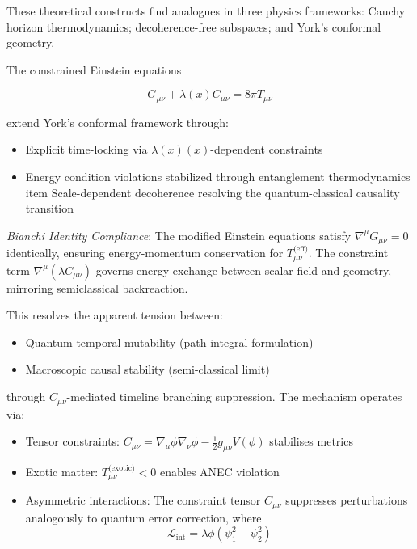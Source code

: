 \documentclass[twocolumn]{article}
\newcommand{\lagrange}{\lambda(x)}
\begin{document}
	These theoretical constructs find analogues in three physics frameworks: Cauchy horizon thermodynamics\cite{hawking1992}; decoherence-free subspaces\cite{zurek2003,lidar1998}; and York's conformal geometry\cite{york1972}.
	
	The constrained Einstein equations
	
	\begin{equation}
		G_{\mu\nu} + \lagrange C_{\mu\nu} = 8\pi T_{\mu\nu}
\label{eq:modified_einstein_main}
	\end{equation}
	
	extend York's conformal framework\cite{york1972} through:
	
	\begin{itemize}
		\item Explicit time-locking via $\lagrange(x)$-dependent constraints
		\item Energy condition violations stabilized through entanglement thermodynamics\cite{gao2017}
		\\item Scale-dependent decoherence resolving the quantum-classical causality transition\cite{schlosshauer2019}
	\end{itemize}
	
	\emph{Bianchi Identity Compliance}: The modified Einstein equations satisfy $\nabla^\mu G_{\mu\nu} = 0$ identically, ensuring energy-momentum conservation for $T_{\mu\nu}^{\text{(eff)}}$\cite{Wald1984}. The constraint term $\nabla^\mu(\lambda C_{\mu\nu})$ governs energy exchange between scalar field and geometry, mirroring semiclassical backreaction\cite{Fewster2015}.
	
	This resolves the apparent tension between:
	
	\begin{itemize}
		\item Quantum temporal mutability (path integral formulation\cite{deutsch1991})
		\item Macroscopic causal stability (semi-classical limit\cite{thorne1988})
	\end{itemize}
	
	through $C_{\mu\nu}$-mediated timeline branching suppression. The mechanism operates via:
	
	\begin{itemize}
		\item Tensor constraints: $C_{\mu\nu} = \nabla_\mu\phi\nabla_\nu\phi - \frac{1}{2}g_{\mu\nu}V(\phi)$ stabilises metrics
		\item Exotic matter: $T_{\mu\nu}^{\text{(exotic)}} < 0$ enables ANEC violation\cite{ford2000}
		\item Asymmetric interactions: The constraint tensor $C_{\mu\nu}$ suppresses perturbations analogously to quantum error correction, where
		\begin{equation}
			\mathcal{L}_{\text{int}} = \lambda\phi(\psi_1^2 - \psi_2^2)
\label{eq:new_coupling}
		\end{equation} 
	\end{itemize}
	
\end{document}
